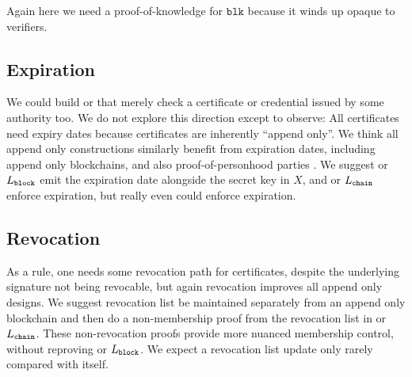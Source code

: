 Again here we need a proof-of-knowledge for $\mathtt{blk}$ because
it winds up opaque to verifiers.


\subsection{Expiration} %

We could build \piring or \pipk that merely check a certificate or
credential issued by some authority too.
We do not explore this direction except to observe: 
All certificates need expiry dates because certificates are inherently
``append only''.  We think all append only \ring constructions similarly
benefit from expiration dates, including append only blockchains, and
also proof-of-personhood parties \cite{pop2008,pop2017}.
We suggest \pisk or $L_{\mathtt{block}}$ emit the expiration date
alongside the secret key in $X$, and \pipk or $L_{\mathtt{chain}}$
enforce expiration, but really even \PedVRF could enforce expiration.

%


\subsection{Revocation}

As a rule, one needs some revocation path for certificates,
despite the underlying signature not being revocable, but again
revocation improves all append only \ring designs.
%
We suggest revocation list be maintained separately from an append only
blockchain and then do a non-membership proof from the revocation list
in \pipk or $L_{\mathtt{chain}}$.  %
These non-revocation proofs provide more nuanced \ring membership
control, without reproving \pisk or $L_{\mathtt{block}}$.
We expect a revocation list update only rarely compared with \ring itself.




